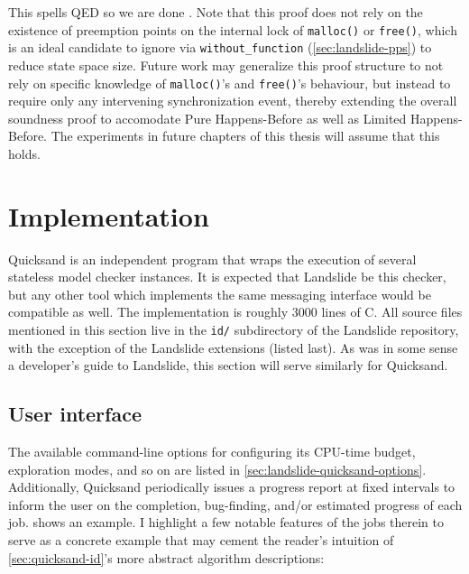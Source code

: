 This spells QED so we are done \cite{vargomax}. %
Note that this proof does not rely on the existence of preemption points on
the internal lock of {\tt malloc()} or {\tt free()},
which is an ideal candidate to ignore via {\tt without\_function} (\cref{sec:landslide-pps})
to reduce state space size.
Future work may generalize this proof structure to not rely on specific knowledge
of {\tt malloc()}'s and {\tt free()}'s behaviour,
but instead to require only any intervening synchronization event,
thereby extending the overall soundness proof to accomodate Pure Happens-Before as well as Limited Happens-Before.
The experiments in future chapters of this thesis will assume that this holds.


\section{Implementation}
\label{sec:quicksand-implementation}

Quicksand is an independent program that wraps the execution of several stateless model checker instances.
It is expected that Landslide be this checker,
but any other tool which implements the same messaging interface would be compatible as well.
The implementation is roughly 3000 lines of C.
All source files mentioned in this section live in the {\tt id/} subdirectory of the Landslide repository,
with the exception of the Landslide extensions (listed last).
As  was in some sense a developer's guide to Landslide,
this section will serve similarly for Quicksand.

\subsection{User interface}

The available command-line options for configuring its
CPU-time budget, exploration modes, and so on
are listed in \cref{sec:landslide-quicksand-options}.
Additionally, Quicksand periodically issues a progress report
at fixed intervals to inform the user on the completion, bug-finding, and/or estimated progress of each job.
 shows an example.
I highlight a few notable features of the jobs therein
to serve as a concrete example that may cement the reader's intuition
of \cref{sec:quicksand-id}'s more abstract algorithm descriptions:

